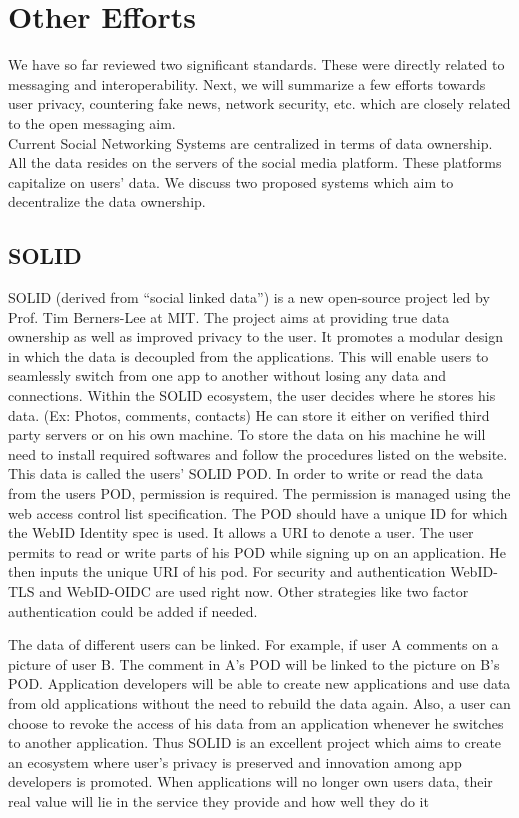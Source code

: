 \documentclass[12pt, conference, a4paper]{article}
\begin{document}
\section{Other Efforts}
\label{SEC: other}
We have so far reviewed two significant standards. These were directly related to messaging and interoperability. Next, we will summarize a few efforts towards user privacy, countering fake news, network security, etc. which are closely related to the open messaging aim. \\
Current Social Networking Systems are centralized in terms of data ownership. All the data resides on the servers of the social media platform. These platforms capitalize on users' data. We discuss two proposed systems which aim to decentralize the data ownership.
\subsection{SOLID}
SOLID (derived from “social linked data”) is a new open-source project led by Prof. Tim Berners-Lee at MIT. \cite{SOLID} The project aims at providing true data ownership as well as improved privacy to the user. It promotes a modular design in which the data is decoupled from the applications. This will enable users to seamlessly switch from one app to another without losing any data and connections.  Within the SOLID ecosystem, the user decides where he stores his data. (Ex: Photos, comments, contacts) He can store it either on verified third party servers or on his own machine. To store the data on his machine he will need to install required softwares and follow the procedures listed on the website. This data is called the users' SOLID POD.  In order to write or read the data from the users POD, permission is required. The permission is managed using the web access control list specification. The POD should have a unique ID for which the WebID Identity spec is used. It allows a URI to denote a user. The user permits to read or write parts of his POD while signing up on an application. He then inputs the unique URI of his pod.   For security and authentication WebID-TLS and WebID-OIDC are used right now. Other strategies like two factor authentication could be added if needed.
\par
The data of different users can be linked. For example, if user A comments on a picture of user B. The comment in A’s POD will be linked to the picture on B’s POD. Application developers will be able to create new applications and use data from old applications without the need to rebuild the data again. Also, a user can choose to revoke the access of his data from an application whenever he switches to another application. Thus SOLID is an excellent project which aims to create an ecosystem where user’s privacy is preserved and innovation among app developers is promoted. When applications will no longer own users data, their real value will lie in the service they provide and how well they do it
\end{document}

